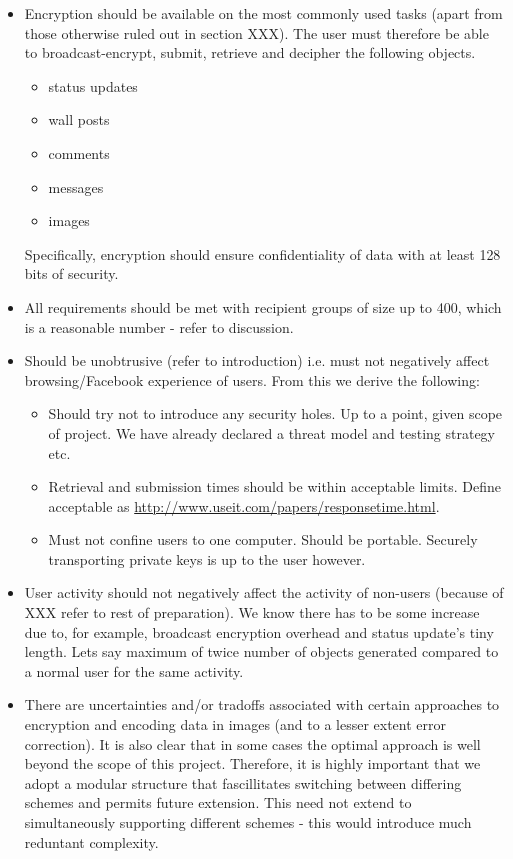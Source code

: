 \begin{itemize}

    \item Encryption should be available on the most commonly used tasks (apart from those otherwise ruled out in section XXX). The user must therefore be able to broadcast-encrypt, submit, retrieve and decipher the following objects.
    
    \begin{itemize}
        \item status updates
        \item wall posts
        \item comments
        \item messages
        \item images
    \end{itemize}
    
    Specifically, encryption should ensure confidentiality of data with at least 128 bits of security.
    
    \item All requirements should be met with recipient groups of size up to 400, which is a reasonable number - refer to discussion.
    
    \item Should be unobtrusive (refer to introduction) i.e. must not negatively affect browsing/Facebook experience of users. From this we derive the following:
    \begin{itemize}
        \item Should try not to introduce any security holes. Up to a point, given scope of project. We have already declared a threat model and testing strategy etc.
        \item Retrieval and submission times should be within acceptable limits. Define acceptable as \url{http://www.useit.com/papers/responsetime.html}.
        \item Must not confine users to one computer. Should be portable. Securely transporting private keys is up to the user however.
    \end{itemize}
    
    \item User activity should not negatively affect the activity of non-users (because of XXX refer to rest of preparation). We know there has to be some increase due to, for example, broadcast encryption overhead and status update's tiny length. Lets say maximum of twice number of objects generated compared to a normal user for the same activity.

    \item There are uncertainties and/or tradoffs associated with certain approaches to encryption and encoding data in images (and to a lesser extent error correction). It is also clear that in some cases the optimal approach is well beyond the scope of this project. Therefore, it is highly important that we adopt a modular structure that fascillitates switching between differing schemes and permits future extension. This need not extend to simultaneously supporting different schemes - this would introduce much reduntant complexity.
    
    
\end{itemize}